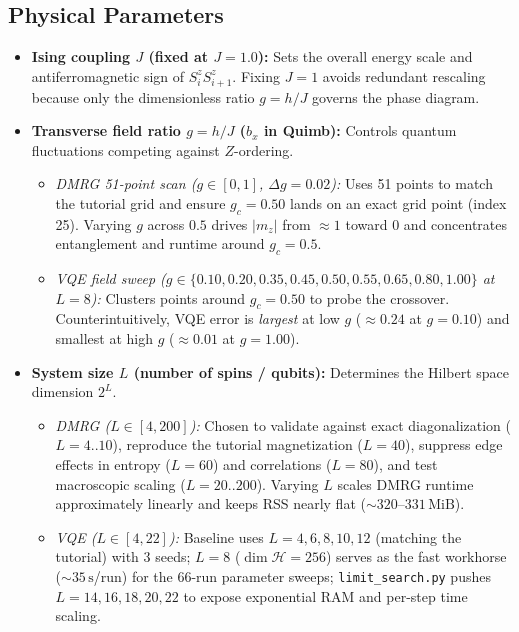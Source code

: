 \documentclass[11pt,a4paper]{article}
\begin{document}
\subsection{Physical Parameters}
\begin{itemize}[leftmargin=*]
\item \textbf{Ising coupling $J$ (fixed at $J = 1.0$):} Sets the overall energy scale and antiferromagnetic sign of $S_i^z S_{i+1}^z$. Fixing $J=1$ avoids redundant rescaling because only the dimensionless ratio $g = h/J$ governs the phase diagram.
\item \textbf{Transverse field ratio $g = h/J$ ($b_x$ in Quimb):} Controls quantum fluctuations competing against $Z$-ordering.
  \begin{itemize}
  \item \emph{DMRG 51-point scan ($g \in [0, 1]$, $\Delta g = 0.02$):} Uses 51 points to match the tutorial grid and ensure $g_c = 0.50$ lands on an exact grid point (index 25). Varying $g$ across $0.5$ drives $|m_z|$ from $\approx 1$ toward $0$ and concentrates entanglement and runtime around $g_c=0.5$.
  \item \emph{VQE field sweep ($g \in \{0.10, 0.20, 0.35, 0.45, 0.50, 0.55, 0.65, 0.80, 1.00\}$ at $L=8$):} Clusters points around $g_c = 0.50$ to probe the crossover. Counterintuitively, VQE error is \emph{largest} at low $g$ ($\approx 0.24$ at $g=0.10$) and smallest at high $g$ ($\approx 0.01$ at $g=1.00$).
  \end{itemize}
\item \textbf{System size $L$ (number of spins / qubits):} Determines the Hilbert space dimension $2^L$.
  \begin{itemize}
  \item \emph{DMRG ($L \in [4, 200]$):} Chosen to validate against exact diagonalization ($L=4..10$), reproduce the tutorial magnetization ($L=40$), suppress edge effects in entropy ($L=60$) and correlations ($L=80$), and test macroscopic scaling ($L=20..200$). Varying $L$ scales DMRG runtime approximately linearly and keeps RSS nearly flat ($\sim 320\text{--}331\,\mathrm{MiB}$).
  \item \emph{VQE ($L \in [4, 22]$):} Baseline uses $L=4,6,8,10,12$ (matching the tutorial) with 3 seeds; $L=8$ ($\dim\mathcal{H}=256$) serves as the fast workhorse ($\sim 35\,\mathrm{s}$/run) for the 66-run parameter sweeps; \texttt{limit\_search.py} pushes $L=14,16,18,20,22$ to expose exponential RAM and per-step time scaling.
  \end{itemize}
\end{itemize}
\end{document}

